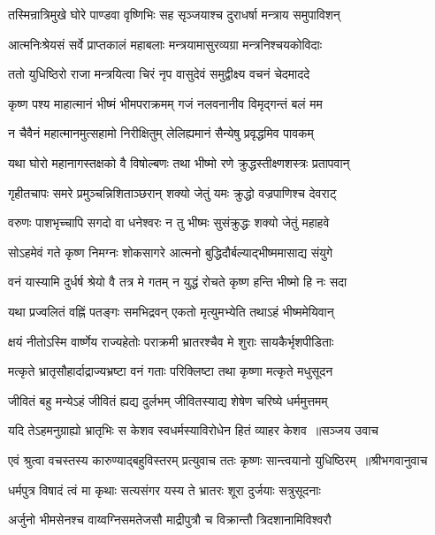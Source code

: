 \twolineshloka
{तस्मिन्रात्रिमुखे घोरे पाण्डवा वृष्णिभिः सह}
{सृञ्जयाश्च दुराधर्षा मन्त्राय समुपाविशन्}


\twolineshloka
{आत्मनिःश्रेयसं सर्वे प्राप्तकालं महाबलाः}
{मन्त्रयामासुरव्यग्रा मन्त्रनिश्चयकोविदाः}


\twolineshloka
{ततो युधिष्ठिरो राजा मन्त्रयित्वा चिरं नृप}
{वासुदेवं समुद्वीक्ष्य वचनं चेदमाददे}


\twolineshloka
{कृष्ण पश्य माहात्मानं भीष्मं भीमपराक्रमम्}
{गजं नलवनानीव विमृद्गन्तं बलं मम}


\twolineshloka
{न चैवैनं महात्मानमुत्सहामो निरीक्षितुम्}
{लेलिह्यमानं सैन्येषु प्रवृद्धमिव पावकम्}


\twolineshloka
{यथा घोरो महानागस्तक्षको वै विषोल्बणः}
{तथा भीष्मो रणे क्रुद्धस्तीक्ष्णशस्त्रः प्रतापवान्}


\twolineshloka
{गृहीतचापः समरे प्रमुञ्चन्निशिताञ्छरान्}
{शक्यो जेतुं यमः क्रुद्धो वज्रपाणिश्च देवराट्}


\twolineshloka
{वरुणः पाशभृच्चापि सगदो वा धनेश्वरः}
{न तु भीष्मः सुसंक्रुद्धः शक्यो जेतुं महाहवे}


\twolineshloka
{सोऽहमेवं गते कृष्ण निमग्नः शोकसागरे}
{आत्मनो बुद्धिदौर्बल्याद्भीष्ममासाद्य संयुगे}


\twolineshloka
{वनं यास्यामि दुर्धर्ष श्रेयो वै तत्र मे गतम्}
{न युद्धं रोचते कृष्ण हन्ति भीष्मो हि नः सदा}


\twolineshloka
{यथा प्रज्वलितं वह्निं पतङ्गः समभिद्रवन्}
{एकतो मृत्युमभ्येति तथाऽहं भीष्ममेयिवान्}


\twolineshloka
{क्षयं नीतोऽस्मि वार्ष्णेय राज्यहेतोः पराक्रमी}
{भ्रातरश्चैव मे शुराः सायकैर्भृशपीडिताः}


\twolineshloka
{मत्कृते भ्रातृसौहार्दाद्राज्यभ्रष्टा वनं गताः}
{परिक्लिष्टा तथा कृष्णा मत्कृते मधुसूदन}


\twolineshloka
{जीवितं बहु मन्येऽहं जीवितं ह्यद्य दुर्लभम्}
{जीवितस्याद्य शेषेण चरिष्ये धर्ममुत्तमम्}


\threelineshloka
{यदि तेऽहमनुग्राह्यो भ्रातृभिः स केशव}
{स्वधर्मस्याविरोधेन हितं व्याहर केशव ॥सञ्जय उवाच}
{}


\threelineshloka
{एवं श्रुत्वा वचस्तस्य कारुण्याद्बहुविस्तरम्}
{प्रत्युवाच ततः कृष्णः सान्त्वयानो युधिष्ठिरम् ॥श्रीभगवानुवाच}
{}


\twolineshloka
{धर्मपुत्र विषादं त्वं मा कृथाः सत्यसंगर}
{यस्य ते भ्रातरः शूरा दुर्जयाः सत्रुसूदनाः}


\twolineshloka
{अर्जुनो भीमसेनश्च वाय्वग्निसमतेजसौ}
{माद्रीपुत्रौ च विक्रान्तौ त्रिदशानामिविश्वरौ}


